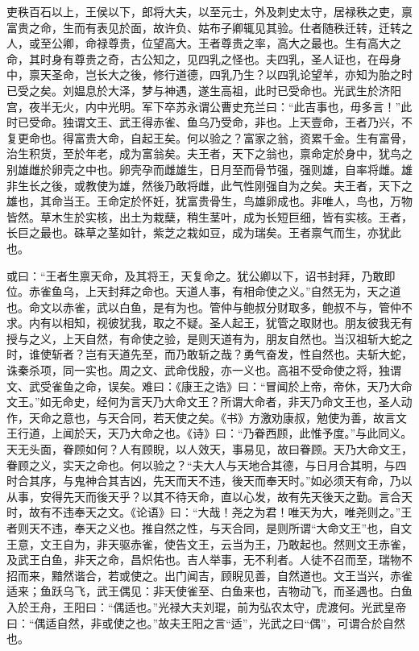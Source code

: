 \documentclass[]{article}
\begin{document}
吏秩百石以上，王侯以下，郎将大夫，以至元士，外及刺史太守，居禄秩之吏，禀富贵之命，生而有表见於面，故许负、姑布子卿辄见其验。仕者随秩迁转，迁转之人，或至公卿，命禄尊贵，位望高大。王者尊贵之率，高大之最也。生有高大之命，其时身有尊贵之奇，古公知之，见四乳之怪也。夫四乳，圣人证也，在母身中，禀天圣命，岂长大之後，修行道德，四乳乃生？以四乳论望羊，亦知为胎之时已受之矣。刘媪息於大泽，梦与神遇，遂生高祖，此时已受命也。光武生於济阳宫，夜半无火，内中光明。军下卒苏永谓公曹史充兰曰：``此吉事也，毋多言！''此时已受命。独谓文王、武王得赤雀、鱼乌乃受命，非也。上天壹命，王者乃兴，不复更命也。得富贵大命，自起王矣。何以验之？富家之翁，资累千金。生有富骨，治生积货，至於年老，成为富翁矣。夫王者，天下之翁也，禀命定於身中，犹鸟之别雄雌於卵壳之中也。卵壳孕而雌雄生，日月至而骨节强，强则雄，自率将雌。雄非生长之後，或教使为雄，然後乃敢将雌，此气性刚强自为之矣。夫王者，天下之雄也，其命当王。王命定於怀妊，犹富贵骨生，鸟雄卵成也。非唯人，鸟也，万物皆然。草木生於实核，出土为栽蘖，稍生茎叶，成为长短巨细，皆有实核。王者，长巨之最也。硃草之茎如针，紫芝之栽如豆，成为瑞矣。王者禀气而生，亦犹此也。

或曰：``王者生禀天命，及其将王，天复命之。犹公卿以下，诏书封拜，乃敢即位。赤雀鱼乌，上天封拜之命也。天道人事，有相命使之义。''自然无为，天之道也。命文以赤雀，武以白鱼，是有为也。管仲与鲍叔分财取多，鲍叔不与，管仲不求。内有以相知，视彼犹我，取之不疑。圣人起王，犹管之取财也。朋友彼我无有授与之义，上天自然，有命使之验，是则天道有为，朋友自然也。当汉祖斩大蛇之时，谁使斩者？岂有天道先至，而乃敢斩之哉？勇气奋发，性自然也。夫斩大蛇，诛秦杀项，同一实也。周之文、武命伐殷，亦一义也。高祖不受命使之将，独谓文、武受雀鱼之命，误矣。难曰：《康王之诰》曰：``冒闻於上帝，帝休，天乃大命文王。''如无命史，经何为言天乃大命文王？所谓大命者，非天乃命文王也，圣人动作，天命之意也，与天合同，若天使之矣。《书》方激劝康叔，勉使为善，故言文王行道，上闻於天，天乃大命之也。《诗》曰：``乃眷西顾，此惟予度。''与此同义。天无头面，眷顾如何？人有顾睨，以人效天，事易见，故曰眷顾。天乃大命文王，眷顾之义，实天之命也。何以验之？``夫大人与天地合其德，与日月合其明，与四时合其序，与鬼神合其吉凶，先天而天不违，後天而奉天时。''如必须天有命，乃以从事，安得先天而後天乎？以其不待天命，直以心发，故有先天後天之勤。言合天时，故有不违奉天之文。《论语》曰：``大哉！尧之为君！唯天为大，唯尧则之。''王者则天不违，奉天之义也。推自然之性，与天合同，是则所谓``大命文王''也，自文王意，文王自为，非天驱赤雀，使告文王，云当为王，乃敢起也。然则文王赤雀，及武王白鱼，非天之命，昌炽佑也。吉人举事，无不利者。人徒不召而至，瑞物不招而来，黯然谐合，若或使之。出门闻吉，顾睨见善，自然道也。文王当兴，赤雀适来；鱼跃乌飞，武王偶见：非天使雀至、白鱼来也，吉物动飞，而圣遇也。白鱼入於王舟，王阳曰：``偶适也。''光禄大夫刘琨，前为弘农太守，虎渡何。光武皇帝曰：``偶适自然，非或使之也。''故夫王阳之言``适''，光武之曰``偶''，可谓合於自然也。
\end{document}
